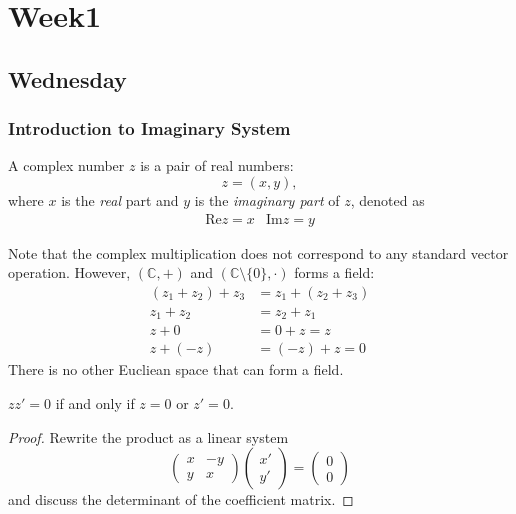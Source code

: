
\chapter{Week1}

\section{Wednesday}
\subsection{Introduction to Imaginary System}
\begin{definition}
A complex number $z$ is a pair of real numbers:
\[
z = (x,y),
\]
where $x$ is the \emph{real} part and $y$ is the \emph{imaginary part} of $z$, denoted as
\[
\begin{array}{ll}
\mbox{Re}z = x
&
\mbox{Im}z = y
\end{array}
\]
\end{definition}
\begin{remark}
Note that the complex multiplication does not correspond to any standard vector operation. However, $(\mathbb{C},+)$ and $(\mathbb{C}\setminus\{0\},\cdot)$ forms a field:
\begin{align*}
(z_1+z_2)+z_3&=z_1+(z_2+z_3)\\
z_1+z_2&=z_2+z_1\\
z+0&=0+z=z\\
z+(-z)&=(-z)+z=0
\end{align*}
There is no other Eucliean space that can form a field.
\end{remark}
\begin{proposition}
$zz'=0$ if and only if $z=0$ or $z'=0$.
\end{proposition}
\begin{proof}
Rewrite the product as a linear system
\[
\begin{pmatrix}
x&-y\\y&x
\end{pmatrix}\begin{pmatrix}
x'\\y'
\end{pmatrix}=\begin{pmatrix}
0\\0
\end{pmatrix}
\]
and discuss the determinant of the coefficient matrix.
\end{proof}
